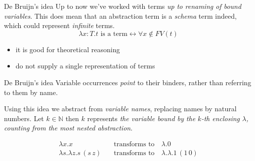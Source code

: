 \documentclass[8pt]{beamer}
\begin{document}
\begin{frame}{De Bruijn's idea}
    Up to now we've worked with terms \emph{up to renaming of bound 
    variables}. This does mean that an abstraction term is a \emph{schema}
    term indeed, which could represent \emph{infinite} terms.
    \begin{displaymath}
        \lambda x:T.t \text{ is a term} \leftrightarrow 
            \forall x \not \in FV(t)
    \end{displaymath}
    \begin{itemize}
        \item it is good for theoretical reasoning \smiley
        \item do not supply a single representation of terms \frownie
    \end{itemize}
    \pause
    \begin{block}{De Bruijn's idea}
        Variable occurrences \emph{point} to their binders, rather 
        than referring to them by name.
    \end{block}
    Using this idea we abstract from \emph{variable names}, replacing names by
    natural numbers. Let $k \in \mathbb{N}$ then $k$ represents \emph{the variable 
    bound by the $k$-th enclosing $\lambda$, counting from the most nested abstraction}.
    \pause
    \begin{example}
        \begin{displaymath}
            \begin{split}
                \lambda x.x \quad & \text{transforms to} \quad \lambda.0\\
                \lambda s.\lambda z.s \, (s\,  z) \quad & 
                    \text{transforms to} \quad \lambda.\lambda.1\,  (1\,  0)
            \end{split}
        \end{displaymath}
    \end{example}
\end{frame}
\end{document}
